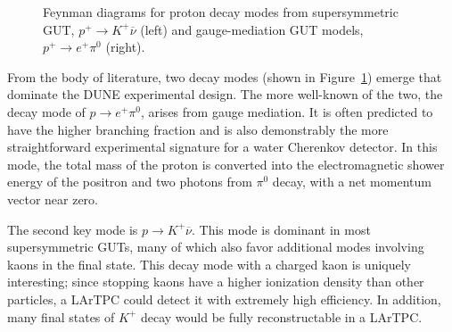 \begin{figure}[!htb]
\begin{center}
  \end{center}
\caption[Proton decay modes from SUSY and gauge-mediation models]{Feynman
diagrams for proton decay modes from
supersymmetric GUT, $p^+ \rightarrow K^+ \overline{\nu}$  (left) and
gauge-mediation GUT models, $p^+ \rightarrow e^+ \pi^0$ (right).}
\label{pdk_feyn}
\end{figure}
From the body of literature, two decay modes (shown in Figure~\ref{pdk_feyn})
emerge that dominate the DUNE experimental design. The more
well-known of the two, the decay mode of $p \rightarrow e^+ \pi^0$,
arises from gauge mediation.  It is often predicted to have the higher
branching fraction and is also demonstrably the more straightforward
experimental signature for a water Cherenkov detector. In this mode,
the total mass of the proton is converted into the electromagnetic
shower energy of the positron and two photons from $\pi^0$ decay,
with a net momentum vector near zero. 

The second key mode is $p \rightarrow K^+ \overline{\nu}$.  This mode is
dominant in most supersymmetric GUTs, many of which also favor additional modes
involving kaons in the final state. This decay mode with a charged kaon is
uniquely interesting; since stopping kaons have a higher ionization density
than other particles, a LArTPC could detect it with extremely high efficiency.
In addition, many final states of $K^+$ decay would be fully reconstructable in
a LArTPC.

